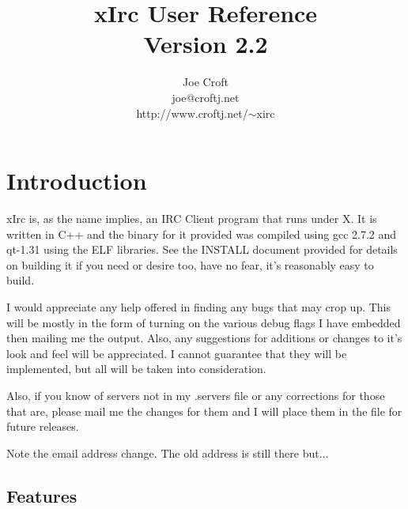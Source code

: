 \documentclass[titlepage]{article}
\title{xIrc User Reference\\
Version 2.2}
\author{Joe Croft \\
joe@croftj.net \\
http://www.croftj.net/$\sim$xirc }
\begin{document}
\setcounter{tocdepth}{2}

\maketitle
\tableofcontents
\pagebreak[4]
\section{Introduction}
xIrc is, as the name implies, an IRC Client program that runs under X.
It is written in C++ and the binary for it provided was compiled using
gcc  2.7.2  and  qt-1.31  using  the  ELF  libraries.  See the INSTALL
document  provided  for  details  on building it if you need or desire
too, have no fear, it's reasonably easy to build.

I would appreciate any help
offered  in  finding any bugs that may crop up. This will be mostly in
the  form  of  turning on the various debug flags I have embedded then
mailing  me the output. Also, any suggestions for additions or changes
to  it's  look  and  feel will be appreciated. I cannot guarantee that
they will be implemented, but all will be taken into consideration.

Also, if you know of servers not in my .servers file or any corrections for
those that are, please mail me the changes for them and I will place them
in the file for future releases.

Note the email address change. The old address is still there but...

\subsection{Features}
\end{document}
